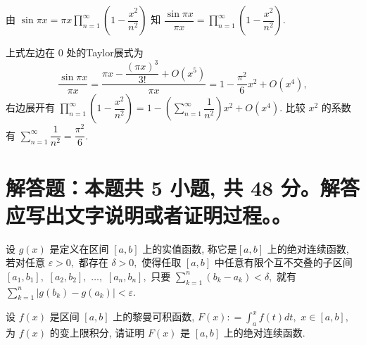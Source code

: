 \begin{solution}
由 $\sin \pi x = \pi x \prod\limits_{n=1}^{\infty} \left( 1 - \dfrac{x^2}{n^2} \right)$ 知 $\dfrac{\sin \pi x}{\pi x} = \prod\limits_{n=1}^{\infty} \left( 1 - \dfrac{x^2}{n^2} \right).$

上式左边在 $0$ 处的Taylor展式为
\[\dfrac{\sin \pi x}{\pi x} = \dfrac{\pi x - \dfrac{(\pi x)^3}{3!} + O(x^5)}{\pi x} = 1 - \dfrac{\pi^2}{6} x^2 + O(x^4), \]
右边展开有 $\prod\limits_{n=1}^{\infty} \left( 1 - \dfrac{x^2}{n^2} \right) = 1 - \left( \sum\limits_{n=1}^{\infty} \dfrac{1}{n^2} \right) x^2 + O(x^4).$ 比较 $x^2$ 的系数有 $\sum\limits_{n=1}^{\infty} \dfrac{1}{n^2} = \dfrac{\pi^2}{6}.$
\end{solution}


\showquestionpoints
\section{解答题：本题共 5 小题, 共 48 分。解答应写出文字说明或者证明过程。。}


\begin{question}[points = 6]
设 $g(x)$ 是定义在区间 $[a, b]$ 上的实值函数, 称它是$[a, b]$ 上的绝对连续函数, 若对任意 $\varepsilon > 0,$ 都存在 $\delta > 0,$ 使得任取 $[a, b]$ 中任意有限个互不交叠的子区间 $[a_1, b_1],$ $[a_2, b_2],$ $\dots,$ $[a_n, b_n],$ 只要 $\sum\limits_{k=1}^n (b_k - a_k) < \delta,$ 就有 $\sum\limits_{k=1}^n \lvert g(b_k) - g(a_k) \rvert < \varepsilon.$

设 $f(x)$ 是区间 $[a, b]$ 上的黎曼可积函数, $F(x) : = \int_{a}^{x} f(t) dt,$ $x \in [a, b],$ 为 $f(x)$ 的变上限积分, 请证明 $F(x)$ 是 $[a, b]$ 上的绝对连续函数.

\end{question}

